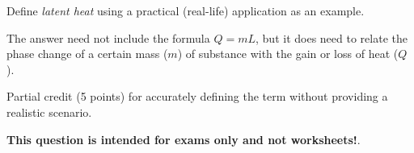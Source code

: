 

Define {\it latent heat} using a practical (real-life) application as an example.

\vskip 50pt







The answer need not include the formula $Q = mL$, but it does need to relate the phase change of a certain mass ($m$) of substance with the gain or loss of heat ($Q$).

\vskip 10pt

Partial credit (5 points) for accurately defining the term without providing a realistic scenario.







{\bf This question is intended for exams only and not worksheets!}.




